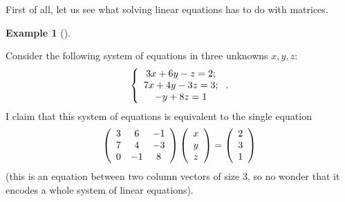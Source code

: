 \documentclass[numbers=enddot,12pt,final,onecolumn,notitlepage]{scrartcl}%
\theoremstyle{definition}
\newtheorem{exam}[theo]{Example}
\newenvironment{example}[1][]
{\begin{exam}[#1]\begin{leftbar}}
{\end{leftbar}\end{exam}}
\begin{document}
First of all, let us see what solving linear equations has to do with matrices.

\begin{example}
\label{exam.systems}Consider the following system of equations in three
unknowns $x,y,z$:%
\begin{equation}
\left\{
\begin{array}
[c]{c}%
3x+6y-z=2;\\
7x+4y-3z=3;\\
-y+8z=1
\end{array}
\right.  . \label{eq.exam.systems.1}%
\end{equation}
I claim that this system of equations is equivalent to the single equation%
\begin{equation}
\left(
\begin{array}
[c]{ccc}%
3 & 6 & -1\\
7 & 4 & -3\\
0 & -1 & 8
\end{array}
\right)  \left(
\begin{array}
[c]{c}%
x\\
y\\
z
\end{array}
\right)  =\left(
\begin{array}
[c]{c}%
2\\
3\\
1
\end{array}
\right)  \label{eq.exam.systems.2}%
\end{equation}
(this is an equation between two column vectors of size $3$, so no wonder that
it encodes a whole system of linear equations).


\end{example}
\end{document}
